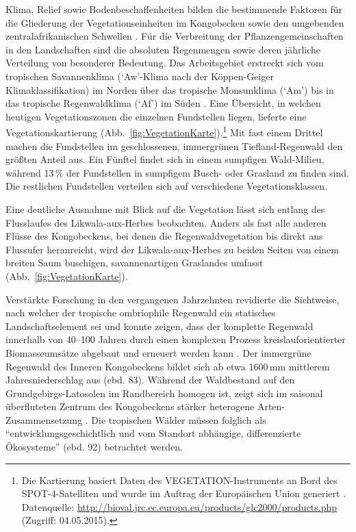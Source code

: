 Klima, Relief sowie Bodenbeschaffenheiten bilden die bestimmende Faktoren für die Gliederung der Vegetationseinheiten im Kongobecken sowie den umgebenden zentralafrikanischen Schwellen \parencite[82]{Runge.2001}. Für die Verbreitung der Pflanzengemeinschaften in den Landschaften sind die absoluten Regenmengen sowie deren jährliche Verteilung von besonderer Bedeutung. Das Arbeitsgebiet erstreckt sich vom tropischen Savannenklima (\enquote*{Aw}-Klima nach der Köppen-Geiger Klimaklassifikation) im Norden über das tropische Monsunklima (\enquote*{Am}) bis in das tropische Regenwaldklima (\enquote*{Af}) im Süden \parencite{Peel.2007}. Eine Übersicht, in welchen heutigen Vegetationszonen die einzelnen Fundstellen liegen, lieferte eine Vegetationskartierung (Abb.~\ref{fig:VegetationKarte}).\footnote{Die Kartierung basiert Daten des VEGETATION-Instruments an Bord des SPOT-4-Satelliten und wurde im Auftrag der Europäischen Union generiert \parencites{Mayaux.2003}[siehe auch][19]{Jones.2013}. Datenquelle: \url{http://bioval.jrc.ec.europa.eu/products/glc2000/products.php} (Zugriff: 04.05.2015).} Mit fast einem Drittel machen die Fundstellen im geschlossenen, immergrünen Tiefland-Regenwald den größten Anteil aus. Ein Fünftel findet sich in einem sumpfigen Wald-Milieu, während 13\,\% der Fundstellen in sumpfigem Busch- oder Grasland zu finden sind. Die restlichen Fundstellen verteilen sich auf verschiedene Vegetationsklassen.

Eine deutliche Ausnahme mit Blick auf die Vegetation lässt sich entlang des Flusslaufes des Likwala-aux-Herbes beobachten. Anders als fast alle anderen Flüsse des Kongobeckens, bei denen die Regenwaldvegetation bis direkt ans Flussufer heranreicht, wird der Likwala-aux-Herbes zu beiden Seiten von einem breiten Saum buschigen, savannenartigen Graslandes umfasst (Abb.~\ref{fig:VegetationKarte}).

Verstärkte Forschung in den vergangenen Jahrzehnten revidierte die Sichtweise, nach welcher der tropische ombriophile Regenwald ein statisches Landschaftselement sei und konnte zeigen, dass der komplette Regenwald innerhalb von 40--100 Jahren durch einen komplexen Prozess kreislauforientierter Biomasseumsätze abgebaut und erneuert werden kann \parencite[83]{Runge.2001}. Der immergrüne Regenwald des Inneren Kongobeckens bildet sich ab etwa 1600\,mm mittlerem Jahresniederschlag aus (ebd. 83). Während der Waldbestand auf den Grundgebirgs-Latosolen im Randbereich homogen ist, zeigt sich im saisonal überfluteten Zentrum des Kongobeckens stärker heterogene Arten-Zusammensetzung \parencite[83f.]{Runge.2001}. Die tropischen Wälder müssen folglich als \enquote{entwicklungsgeschichtlich und vom Standort abhängige, differenzierte Ökosysteme} (ebd. 92) betrachtet werden.

